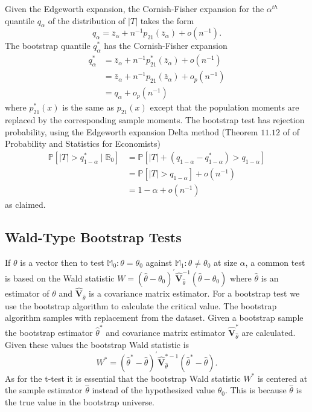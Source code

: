\documentclass[10pt]{article}
\begin{document}
Given the Edgeworth expansion, the Cornish-Fisher expansion for the $\alpha^{t h}$ quantile $q_{\alpha}$ of the distribution of $|T|$ takes the form
$$
q_{\alpha}=\bar{z}_{\alpha}+n^{-1} p_{21}\left(\bar{z}_{\alpha}\right)+o\left(n^{-1}\right) .
$$
The bootstrap quantile $q_{\alpha}^{*}$ has the Cornish-Fisher expansion
$$
\begin{aligned}
q_{\alpha}^{*} &=\bar{z}_{\alpha}+n^{-1} p_{21}^{*}\left(\bar{z}_{\alpha}\right)+o\left(n^{-1}\right) \\
&=\bar{z}_{\alpha}+n^{-1} p_{21}\left(\bar{z}_{\alpha}\right)+o_{p}\left(n^{-1}\right) \\
&=q_{\alpha}+o_{p}\left(n^{-1}\right)
\end{aligned}
$$
where $p_{21}^{*}(x)$ is the same as $p_{21}(x)$ except that the population moments are replaced by the corresponding sample moments. The bootstrap test has rejection probability, using the Edgeworth expansion Delta method (Theorem $11.12$ of of Probability and Statistics for Economists)
$$
\begin{aligned}
\mathbb{P}\left[|T|>q_{1-\alpha}^{*} \mid \mathbb{B}_{0}\right] &=\mathbb{P}\left[|T|+\left(q_{1-\alpha}-q_{1-\alpha}^{*}\right)>q_{1-\alpha}\right] \\
&=\mathbb{P}\left[|T|>q_{1-\alpha}\right]+o\left(n^{-1}\right) \\
&=1-\alpha+o\left(n^{-1}\right)
\end{aligned}
$$
as claimed.

\subsection{Wald-Type Bootstrap Tests}
If $\theta$ is a vector then to test $\mathbb{M}_{0}: \theta=\theta_{0}$ against $\mathbb{M}_{1}: \theta \neq \theta_{0}$ at size $\alpha$, a common test is based on the Wald statistic $W=\left(\widehat{\theta}-\theta_{0}\right)^{\prime} \widehat{\boldsymbol{V}}_{\widehat{\theta}}^{-1}\left(\widehat{\theta}-\theta_{0}\right)$ where $\widehat{\theta}$ is an estimator of $\theta$ and $\widehat{\boldsymbol{V}}_{\widehat{\theta}}$ is a covariance matrix estimator. For a bootstrap test we use the bootstrap algorithm to calculate the critical value. The bootstrap algorithm samples with replacement from the dataset. Given a bootstrap sample the bootstrap estimator $\widehat{\theta}^{*}$ and covariance matrix estimator $\widehat{\boldsymbol{V}}_{\widehat{\theta}}^{*}$ are calculated. Given these values the bootstrap Wald statistic is
$$
W^{*}=\left(\widehat{\theta}^{*}-\widehat{\theta}\right)^{\prime} \widehat{\boldsymbol{V}}_{\widehat{\theta}}^{*-1}\left(\widehat{\theta}^{*}-\widehat{\theta}\right) .
$$
As for the t-test it is essential that the bootstrap Wald statistic $W^{*}$ is centered at the sample estimator $\widehat{\theta}$ instead of the hypothesized value $\theta_{0}$. This is because $\widehat{\theta}$ is the true value in the bootstrap universe.
\end{document}
